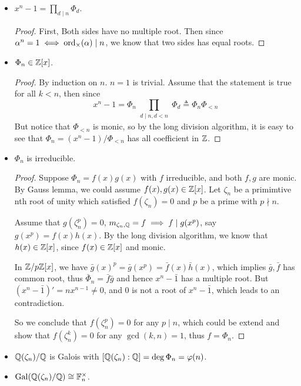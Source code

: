 \begin{prop} \hfill
  \begin{itemize}
    \item $x^n - 1 = \prod_{d \mid n} \Phi_d$.
      \begin{proof}
        First, Both sides have no multiple root. Then since $\alpha^n = 1 \iff \operatorname{ord}_{\times}(\alpha) \mid n$,
        we know that two sides has equal roots.
      \end{proof}
    \item $\Phi_n \in \mathbb{Z}[x]$.
      \begin{proof}
        By induction on $n$. $n = 1$ is trivial.
        Assume that the statement is true for all $k < n$, then since
        \[ x^n - 1 = \Phi_n \prod_{\substack{d \mid n, d < n}} \Phi_d \triangleq \Phi_n \Phi_{< n} \]
        But notice that $\Phi_{<n}$ is monic, so by the long division algorithm, it is easy to
        see that $\Phi_n = (x^n - 1) / \Phi_{<n}$ has all coefficient in $\mathbb{Z}$.
      \end{proof}
    \item $\Phi_n$ is irreducible.
      \begin{proof}
        Suppose $\Phi_n = f(x) g(x)$ with $f$ irreducible, and both $f, g$ are monic.
        By Gauss lemma, we could assume $f(x), g(x) \in \mathbb{Z}[x]$.
        Let $\zeta_n$ be a primimtive nth root of unity  which satisfied $f(\zeta_n) = 0$
        and $p$ be a prime with $p \nmid n$.

        Assume that $g(\zeta_n^p) = 0$, $m_{\zeta_n, \mathbb{Q}} = f \implies f \mid g(x^p)$,
        say $g(x^p) = f(x) h(x)$.
        By the long division algorithm, we know that $h(x) \in \mathbb{Z}[x]$, since $f(x) \in \mathbb{Z}[x]$
        and monic.

        In $\mathbb{Z} / p\mathbb{Z}[x]$, we have $\bar{g}(x)^p = \bar{g}(x^p) = \bar{f}(x) \bar{h}(x)$,
        which implies $\bar{g}, \bar{f}$ has common root, thus $\bar\Phi_n = \bar{f}\bar{g}$ and
        hence $x^n - \bar{1}$ has a multiple root.
        But $(x^n - \bar{1})' = nx^{n-1} \neq 0$, and $0$ is not a root of $x^n - \bar{1}$,
        which leads to an contradiction.

        So we conclude that $f(\zeta_n^p) = 0$ for any $p \mid n$, which could be extend
        and show that $f(\zeta_n^k) = 0$ for any $\gcd(k, n) = 1$, thus $f = \Phi_n$.
      \end{proof}
    \item $\mathbb{Q}(\zeta_n) / \mathbb{Q}$ is Galois with $[\mathbb{Q}(\zeta_n): \mathbb{Q}] = \deg \Phi_n = \varphi(n)$.
    \item $\operatorname{Gal}(\mathbb{Q}(\zeta_n) / \mathbb{Q}) \cong \mathbb{F}_n^\times$.


\end{itemize}
\end{prop}
